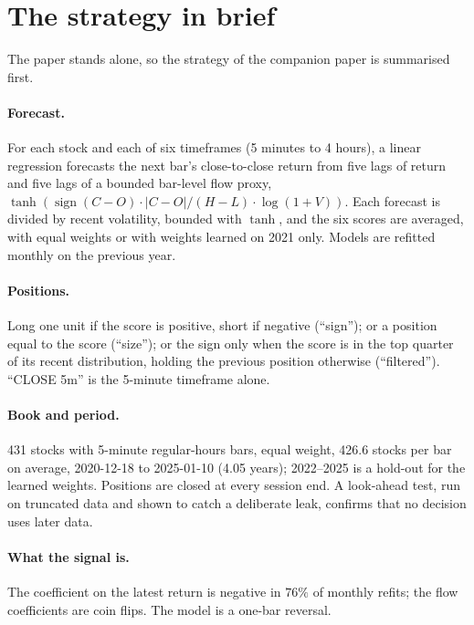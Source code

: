 \documentclass[11pt,a4paper]{article}
\begin{document}
\section{The strategy in brief}
\label{sec:strategy}

The paper stands alone, so the strategy of the companion paper is summarised first.


\paragraph{Forecast.} For each stock and each of six timeframes (5 minutes to 4 hours), a linear
regression forecasts the next bar's close-to-close return from five lags of return and five lags of a
bounded bar-level flow proxy, $\tanh(\operatorname{sign}(C-O)\cdot|C-O|/(H-L)\cdot\log(1+V))$. Each forecast
is divided by recent volatility, bounded with $\tanh$, and the six scores are averaged, with equal weights
or with weights learned on 2021 only. Models are refitted monthly on the previous year.

\paragraph{Positions.} Long one unit if the score is positive, short if negative (``sign''); or a position
equal to the score (``size''); or the sign only when the score is in the top quarter of its recent
distribution, holding the previous position otherwise (``filtered''). ``CLOSE 5m'' is the 5-minute
timeframe alone.

\paragraph{Book and period.} 431 stocks with 5-minute regular-hours bars, equal weight,
426.6 stocks per bar on average, 2020-12-18 to 2025-01-10 (4.05 years); 2022--2025 is a hold-out for
the learned weights. Positions are closed at every session end. A look-ahead test, run on truncated
data and shown to catch a deliberate leak, confirms that no decision uses later data.

\paragraph{What the signal is.} The coefficient on the latest return is negative in $76\%$ of
monthly refits; the flow coefficients are coin flips. The model is a one-bar reversal.
\end{document}
